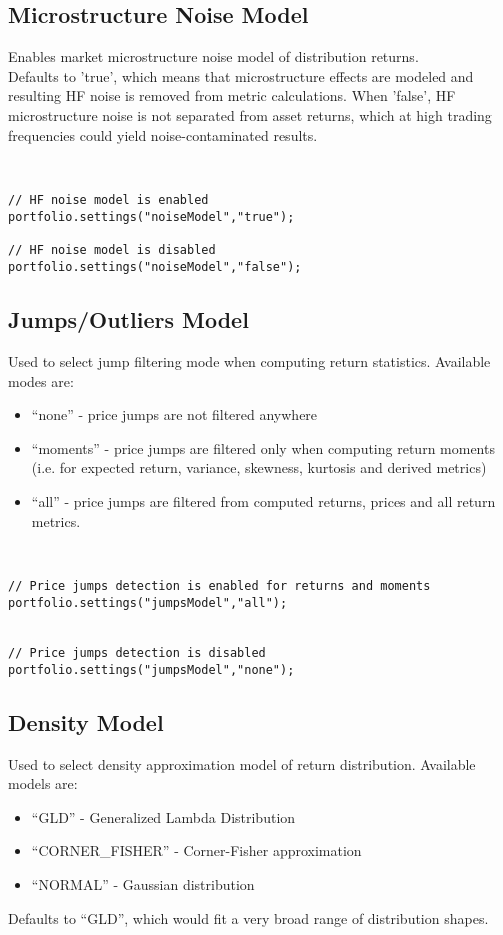 \documentclass[letterpaper]{report}
\newcounter{N}
\begin{document}
\subsection{Microstructure Noise Model}
Enables market microstructure noise model of distribution returns.\\
Defaults to 'true', which means that microstructure effects are modeled and resulting HF noise is removed from metric calculations. 
When 'false', HF microstructure noise is not separated from asset returns, which at high trading frequencies could yield noise-contaminated results.

\begin{lstlisting}


// HF noise model is enabled
portfolio.settings("noiseModel","true");

// HF noise model is disabled
portfolio.settings("noiseModel","false");

\end{lstlisting}

\subsection{Jumps/Outliers Model}
Used to select jump filtering mode when computing return statistics. Available modes are: 
  \begin{itemize} 
\item ``none'' - price jumps are not filtered anywhere
\item ``moments'' - price jumps are filtered only when computing return moments
(i.e. for expected return, variance, skewness, kurtosis and derived
metrics)
\item ``all'' - price jumps are filtered from computed returns, prices and all
return metrics.
\end{itemize}
\begin{lstlisting}


// Price jumps detection is enabled for returns and moments
portfolio.settings("jumpsModel","all");


// Price jumps detection is disabled
portfolio.settings("jumpsModel","none");

\end{lstlisting}

\subsection {Density Model}
Used to select density approximation model of return distribution. Available models are:
  \begin{itemize} 
\item ``GLD'' - Generalized Lambda Distribution
\item ``CORNER\_FISHER'' - Corner-Fisher approximation
\item ``NORMAL'' - Gaussian distribution
\end{itemize}
Defaults to ``GLD'', which would fit a very broad range of distribution shapes.
\end{document}
